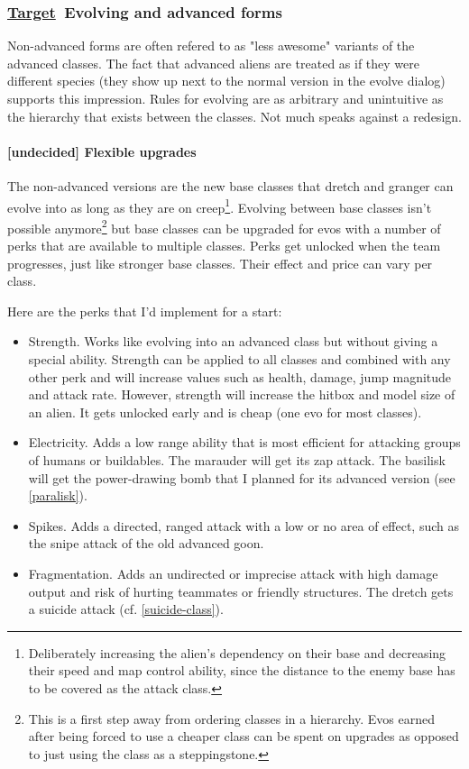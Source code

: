 \documentclass{scrartcl}
\newcommand{\target}   [0]{\textbf{\underline{Target}\ }}
\newcommand{\undecided}[0]{\textcolor{undecided}{\textbf{[undecided] }}}
\begin{document}
\subsubsection{\target Evolving and advanced forms}

Non-advanced forms are often refered to as "less awesome" variants of the advanced classes. The fact that advanced aliens are treated as if they were different species (they show up next to the normal version in the evolve dialog) supports this impression. Rules for evolving are as arbitrary and unintuitive as the hierarchy that exists between the classes. Not much speaks against a redesign.

\paragraph{\undecided Flexible upgrades}
\label{flexible-upgrades}

The non-advanced versions are the new base classes that dretch and granger can evolve into as long as they are on creep\footnote{Deliberately increasing the alien's dependency on their base and decreasing their speed and map control ability, since the distance to the enemy base has to be covered as the attack class.}. Evolving between base classes isn't possible anymore\footnote{This is a first step away from ordering classes in a hierarchy. Evos earned after being forced to use a cheaper class can be spent on upgrades as opposed to just using the class as a steppingstone.} but base classes can be upgraded for evos with a number of perks that are available to multiple classes. Perks get unlocked when the team progresses, just like stronger base classes. Their effect and price can vary per class.

Here are the perks that I'd implement for a start:

\begin{itemize}
\item Strength. Works like evolving into an advanced class but without giving a special ability. Strength can be applied to all classes and combined with any other perk and will increase values such as health, damage, jump magnitude and attack rate. However, strength will increase the hitbox and model size of an alien. It gets unlocked early and is cheap (one evo for most classes).
\item Electricity. Adds a low range ability that is most efficient for attacking groups of humans or buildables. The marauder will get its zap attack. The basilisk will get the power-drawing bomb that I planned for its advanced version (see \ref{paralisk}).
\item Spikes. Adds a directed, ranged attack with a low or no area of effect, such as the snipe attack of the old advanced goon.
\item Fragmentation. Adds an undirected or imprecise attack with high damage output and risk of hurting teammates or friendly structures. The dretch gets a suicide attack (cf. \ref{suicide-class}).
\end{itemize}
\end{document}
